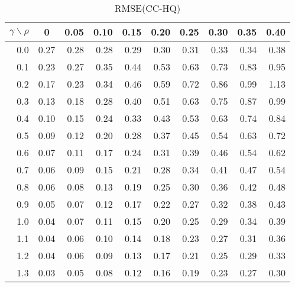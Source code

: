 \documentclass[12pt]{article}
\begin{document}
%
\begin{table}[!tbp]
\caption{RMSE(CC-HQ)}
 \begin{center}
 \begin{tabular}{r|rrrrrrrrr}\hline\hline
\multicolumn{1}{c|}{$\gamma\backslash\rho$}&\multicolumn{1}{c}{0}&\multicolumn{1}{c}{0.05}&\multicolumn{1}{c}{0.10}&\multicolumn{1}{c}{0.15}&\multicolumn{1}{c}{0.20}&\multicolumn{1}{c}{0.25}&\multicolumn{1}{c}{0.30}&\multicolumn{1}{c}{0.35}&\multicolumn{1}{c}{0.40}\tabularnewline
\hline
0.0&0.27&0.28&0.28&0.29&0.30&0.31&0.33&0.34&0.38\tabularnewline
0.1&0.23&0.27&0.35&0.44&0.53&0.63&0.73&0.83&0.95\tabularnewline
0.2&0.17&0.23&0.34&0.46&0.59&0.72&0.86&0.99&1.13\tabularnewline
0.3&0.13&0.18&0.28&0.40&0.51&0.63&0.75&0.87&0.99\tabularnewline
0.4&0.10&0.15&0.24&0.33&0.43&0.53&0.63&0.74&0.84\tabularnewline
0.5&0.09&0.12&0.20&0.28&0.37&0.45&0.54&0.63&0.72\tabularnewline
0.6&0.07&0.11&0.17&0.24&0.31&0.39&0.46&0.54&0.62\tabularnewline
0.7&0.06&0.09&0.15&0.21&0.28&0.34&0.41&0.47&0.54\tabularnewline
0.8&0.06&0.08&0.13&0.19&0.25&0.30&0.36&0.42&0.48\tabularnewline
0.9&0.05&0.07&0.12&0.17&0.22&0.27&0.32&0.38&0.43\tabularnewline
1.0&0.04&0.07&0.11&0.15&0.20&0.25&0.29&0.34&0.39\tabularnewline
1.1&0.04&0.06&0.10&0.14&0.18&0.23&0.27&0.31&0.36\tabularnewline
1.2&0.04&0.06&0.09&0.13&0.17&0.21&0.25&0.29&0.33\tabularnewline
1.3&0.03&0.05&0.08&0.12&0.16&0.19&0.23&0.27&0.30\tabularnewline
\hline
\end{tabular}

\end{center}

\end{table}
\end{document}
